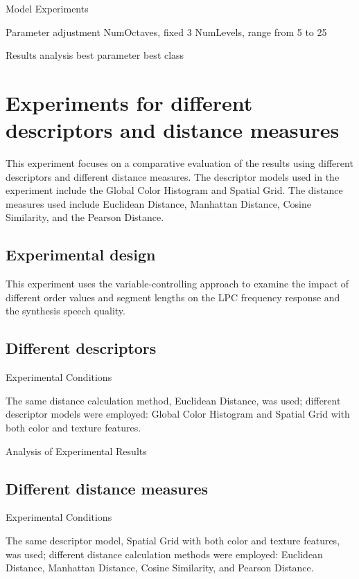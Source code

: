 \documentclass{article}
\begin{document}
Model Experiments

Parameter adjustment
NumOctaves, fixed 3 
NumLevels, range from 5 to 25

Results analysis
best parameter
best class






\section{Experiments for different descriptors and distance measures}

This experiment focuses on a comparative evaluation of the results using different descriptors and different distance measures. The descriptor models used in the experiment include the Global Color Histogram and Spatial Grid. The distance measures used include Euclidean Distance, Manhattan Distance, Cosine Similarity, and the Pearson Distance.

\subsection{Experimental design}

This experiment uses the variable-controlling approach to examine the impact of different order values and segment lengths on the LPC frequency response and the synthesis speech quality.


\subsection{Different descriptors}

Experimental Conditions

The same distance calculation method, Euclidean Distance, was used; different descriptor models were employed: Global Color Histogram and Spatial Grid with both color and texture features.

Analysis of Experimental Results


\subsection{Different distance measures}

Experimental Conditions

The same descriptor model, Spatial Grid with both color and texture features, was used; different distance calculation methods were employed: Euclidean Distance, Manhattan Distance, Cosine Similarity, and Pearson Distance.
\end{document}
